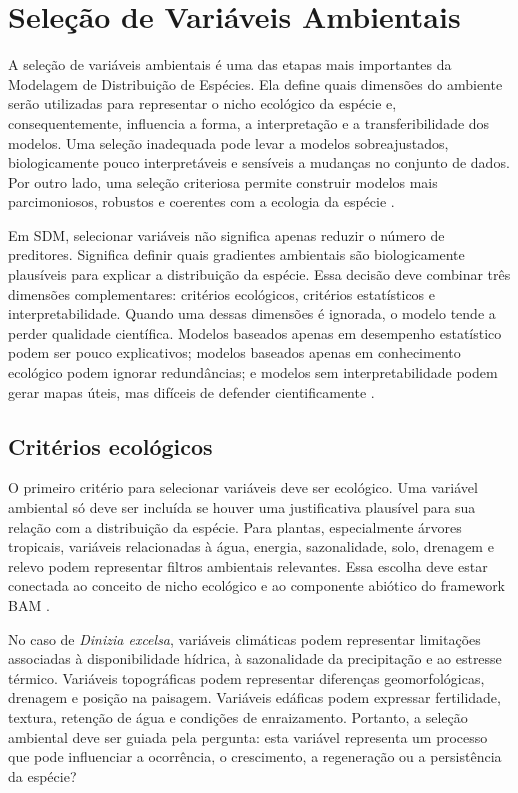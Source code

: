 \section{Seleção de Variáveis Ambientais}

A seleção de variáveis ambientais é uma das etapas mais importantes da Modelagem de Distribuição de Espécies. Ela define quais dimensões do ambiente serão utilizadas para representar o nicho ecológico da espécie e, consequentemente, influencia a forma, a interpretação e a transferibilidade dos modelos. Uma seleção inadequada pode levar a modelos sobreajustados, biologicamente pouco interpretáveis e sensíveis a mudanças no conjunto de dados. Por outro lado, uma seleção criteriosa permite construir modelos mais parcimoniosos, robustos e coerentes com a ecologia da espécie \parencite{franklin2010mapping,guisan2017habitat}.

Em SDM, selecionar variáveis não significa apenas reduzir o número de preditores. Significa definir quais gradientes ambientais são biologicamente plausíveis para explicar a distribuição da espécie. Essa decisão deve combinar três dimensões complementares: critérios ecológicos, critérios estatísticos e interpretabilidade. Quando uma dessas dimensões é ignorada, o modelo tende a perder qualidade científica. Modelos baseados apenas em desempenho estatístico podem ser pouco explicativos; modelos baseados apenas em conhecimento ecológico podem ignorar redundâncias; e modelos sem interpretabilidade podem gerar mapas úteis, mas difíceis de defender cientificamente \parencite{elith2009species,zurell2020standard}.

\subsection{Critérios ecológicos}

O primeiro critério para selecionar variáveis deve ser ecológico. Uma variável ambiental só deve ser incluída se houver uma justificativa plausível para sua relação com a distribuição da espécie. Para plantas, especialmente árvores tropicais, variáveis relacionadas à água, energia, sazonalidade, solo, drenagem e relevo podem representar filtros ambientais relevantes. Essa escolha deve estar conectada ao conceito de nicho ecológico e ao componente abiótico do framework BAM \parencite{hutchinson1957concluding,soberon2007grinnellian}.

No caso de \textit{Dinizia excelsa}, variáveis climáticas podem representar limitações associadas à disponibilidade hídrica, à sazonalidade da precipitação e ao estresse térmico. Variáveis topográficas podem representar diferenças geomorfológicas, drenagem e posição na paisagem. Variáveis edáficas podem expressar fertilidade, textura, retenção de água e condições de enraizamento. Portanto, a seleção ambiental deve ser guiada pela pergunta: esta variável representa um processo que pode influenciar a ocorrência, o crescimento, a regeneração ou a persistência da espécie?

